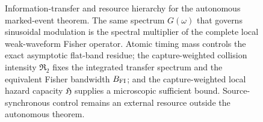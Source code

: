 \begin{figure}[t]
{%
}
\caption{Information-transfer and resource hierarchy for the autonomous marked-event theorem. The same spectrum $G(\omega)$ that governs sinusoidal modulation is the spectral multiplier of the complete local weak-waveform Fisher operator. Atomic timing mass controls the exact asymptotic flat-band residue; the capture-weighted collision intensity $\mathfrak R_2$ fixes the integrated transfer spectrum and the equivalent Fisher bandwidth $B_{\rm FI}$; and the capture-weighted local hazard capacity $\mathfrak H$ supplies a microscopic sufficient bound. Source-synchronous control remains an external resource outside the autonomous theorem.}
\label{fig:resourceHierarchy}
\end{figure}
